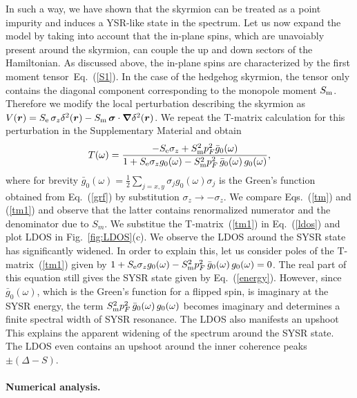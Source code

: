 \documentclass[twocolumn,showpacs,floatfix,nofootinbib,longbibliography]{revtex4-1}
\begin{document}
 In such a way, we have shown that the skyrmion can be treated as a point impurity and induces a YSR-like state in the spectrum. Let us now expand the model by taking into account that the in-plane spins, which are unavoiably present around the skyrmion, can couple the up and down sectors of the Hamiltonian. As discussed above, the in-plane spins are characterized by the first moment tensor~Eq.~(\ref{S1}). In the case of the hedgehog skyrmion, the tensor only contains the diagonal component corresponding to the monopole moment $S_{\rm m}$. Therefore we modify the local perturbation describing the skyrmion as $V(\bm r) =  S_{\rm e}\, \sigma_z\delta^2(\bm r) - S_{\rm m}\, \bm\sigma\cdot\bm \nabla\delta^2(\bm r)$. We repeat the T-matrix calculation for this perturbation in the Supplementary Material and obtain  
\begin{align}
	T(\omega) =   \frac{-S_{\rm e}\sigma_z+S^2_{\rm m}p_F^2\bar g_{0}(\omega)}{1+S_{\rm e}\sigma_zg_{0}(\omega)-S^2_{\rm m}p_F^2\,\bar g_{0}(\omega)\, g_{0}(\omega)}, \label{tm1} 
\end{align}
where for brevity $\bar g_0(\omega) = \frac{1}{2}\sum_{j=x,y} \sigma_j g_0(\omega) \sigma_j $ is the Green's function obtained from Eq.~(\ref{grf}) by substitution $\sigma_z\rightarrow -\sigma_z$. We compare Eqs.~(\ref{tm}) and (\ref{tm1}) and observe that the latter contains renormalized numerator and the denominator due to $S_m$. We substitue the T-matrix~(\ref{tm1}) in Eq.~(\ref{ldos}) and plot LDOS in Fig.~\ref{fig:LDOS}(c). We observe the LDOS around the SYSR state has significantly widened. In order to explain this, let us consider poles of the T-matrix~(\ref{tm1}) given by $1+S_{\rm e}\sigma_zg_{0}(\omega)-S^2_{\rm m}p_F^2\,\bar g_{0}(\omega)\, g_{0}(\omega)=0$. The real part of this equation still gives the SYSR state given by Eq.~(\ref{energy}). However, since $\bar g_0(\omega)$, which is the Green's function for a flipped spin, is imaginary at the SYSR energy, the term $S^2_{\rm m}p_F^2\,\bar g_{0}(\omega)\, g_{0}(\omega)$ becomes imaginary and determines a finite spectral width of SYSR resonance. The LDOS also manifests an upshoot This explains the apparent widening of the spectrum around the SYSR state.  The LDOS even contains an upshoot around the inner coherence peaks $\pm \left( \Delta-S \right)$.
\paragraph*{Numerical analysis.} \label{sec:numerics} 
\end{document}
